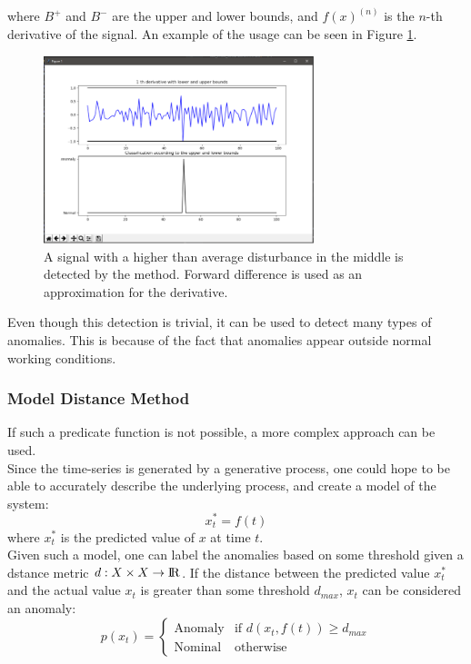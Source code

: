 \documentclass[a4paper, 10pt]{article}
\begin{document}
where $B^+$ and $B^-$ are the upper and lower bounds, and $f(x)^{(n)}$ is the $n$-th derivative of the signal. An example of the usage can be seen in Figure \ref{fig:BDM}.

\begin{figure}
\centering
\includegraphics[width=0.7\textwidth]{BDM}
\caption{A signal with a higher than average disturbance in the middle is detected by the method. Forward difference is used as an approximation for the derivative.}
\label{fig:BDM}
\end{figure}

\FloatBarrier

Even though this detection is trivial, it can be used to detect many types of anomalies. This is because of the fact that anomalies appear outside normal working conditions.

\subsubsection{Model Distance Method}

If such a predicate function is not possible, a more complex approach can be used.\\

Since the time-series is generated by a generative process, one could hope to be able to accurately describe the underlying process, and create a model of the system:
$$x_t^* = f(t)$$
where $x_t^*$ is the predicted value of $x$ at time $t$. \\

Given such a model, one can label the anomalies based on some threshold given a dstance metric $d: X \times X \rightarrow {\rm I\!R}$. If the distance between the predicted value $x_t^*$ and the actual value $x_t$ is greater than some threshold $d_{max}$, $x_t$ can be considered an anomaly:
$$
    p(x_t) =
        \begin{cases}
            \text{Anomaly} & \text{if } d(x_t, f(t)) \ge d_{max} \\
            \text{Nominal} & \text{otherwise}
        \end{cases}
$$
\end{document}
